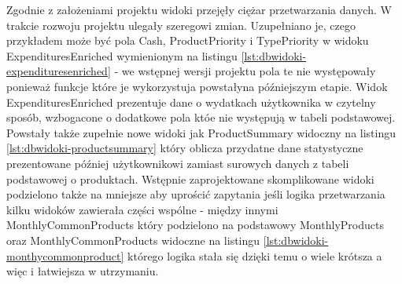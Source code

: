 \documentclass[a4paper,10pt, twoside]{report}
\begin{document}
\begin{large}
{Zgodnie z założeniami projektu widoki przejęły ciężar przetwarzania danych. W 
trakcie rozwoju projektu ulegały szeregowi zmian. Uzupełniano je, 
czego przykładem może być pola Cash, ProductPriority i TypePriority w widoku 
ExpendituresEnriched wymienionym na listingu 
\ref*{lst:dbwidoki-expendituresenriched} - we wstępnej wersji projektu pola te 
nie występowały ponieważ funkcje które je wykorzystuja powstałyna późniejszym 
etapie. Widok ExpendituresEnriched prezentuje dane o wydatkach użytkownika w 
czytelny sposób, wzbogacone o dodatkowe pola któe nie występują w tabeli 
podstawowej. Powstały także zupełnie nowe widoki jak ProductSummary widoczny na 
listingu \ref*{lst:dbwidoki-productsummary} który oblicza przydatne dane 
statystyczne prezentowane później użytkownikowi zamiast surowych danych z tabeli
 podstawowej o produktach. Wstępnie zaprojektowane skomplikowane widoki 
podzielono także na mniejsze aby uprościć zapytania jeśli logika przetwarzania 
kilku widoków zawierała części wspólne - między innymi MonthlyCommonProducts 
który podzielono na podstawowy MonthlyProducts oraz MonthlyCommonProducts 
widoczne na listingu \ref*{lst:dbwidoki-monthycommonproduct} którego logika 
stała się dzięki temu o wiele krótsza a więc i łatwiejsza w utrzymaniu.}



\end{large}
\end{document}
